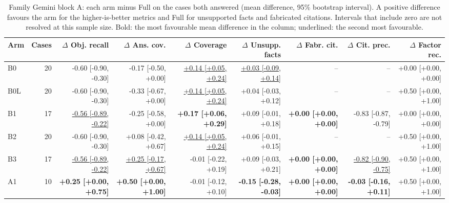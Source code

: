 \begin{table}[t]
\centering\footnotesize
\begin{adjustbox}{max width=\textwidth}
\begin{tabular}{@{}lrrrrrrrr@{}}
\toprule
Arm & Cases & $\Delta$ Obj. recall & $\Delta$ Ans. cov. & $\Delta$ Coverage & $\Delta$ Unsupp. facts & $\Delta$ Fabr. cit. & $\Delta$ Cit. prec. & $\Delta$ Factor rec. \\
\midrule
B0 & 20 & -0.60 [-0.90, -0.30] & -0.17 [-0.50, +0.00] & \underline{+0.14 [+0.05, +0.24]} & \underline{+0.03 [-0.09, +0.14]} & -- & -- & +0.00 [+0.00, +0.00] \\
B0L & 20 & -0.60 [-0.90, -0.30] & -0.33 [-0.67, +0.00] & \underline{+0.14 [+0.05, +0.24]} & +0.04 [-0.03, +0.12] & -- & -- & +0.50 [+0.00, +1.00] \\
B1 & 17 & \underline{-0.56 [-0.89, -0.22]} & -0.25 [-0.58, +0.00] & \textbf{+0.17 [+0.06, +0.29]} & +0.09 [-0.01, +0.18] & \textbf{+0.00 [+0.00, +0.00]} & -0.83 [-0.87, -0.79] & +0.00 [+0.00, +0.00] \\
B2 & 20 & -0.60 [-0.90, -0.30] & +0.08 [-0.42, +0.67] & \underline{+0.14 [+0.05, +0.24]} & +0.06 [-0.01, +0.15] & -- & -- & +0.50 [+0.00, +1.00] \\
B3 & 17 & \underline{-0.56 [-0.89, -0.22]} & \underline{+0.25 [-0.17, +0.67]} & -0.01 [-0.22, +0.19] & +0.09 [-0.03, +0.21] & \textbf{+0.00 [+0.00, +0.00]} & \underline{-0.82 [-0.90, -0.75]} & +0.50 [+0.00, +1.00] \\
A1 & 10 & \textbf{+0.25 [+0.00, +0.75]} & \textbf{+0.50 [+0.00, +1.00]} & -0.01 [-0.12, +0.10] & \textbf{-0.15 [-0.28, -0.03]} & \textbf{+0.00 [+0.00, +0.00]} & \textbf{-0.03 [-0.16, +0.11]} & +0.50 [+0.00, +1.00] \\
\bottomrule
\end{tabular}
\end{adjustbox}
\caption{Family Gemini block A: each arm minus Full on the cases both answered (mean difference, 95\% bootstrap interval). A positive difference favours the arm for the higher-is-better metrics and Full for unsupported facts and fabricated citations. Intervals that include zero are not resolved at this sample size. Bold: the most favourable mean difference in the column; underlined: the second most favourable.}
\label{tab:ablate_gemini}
\end{table}